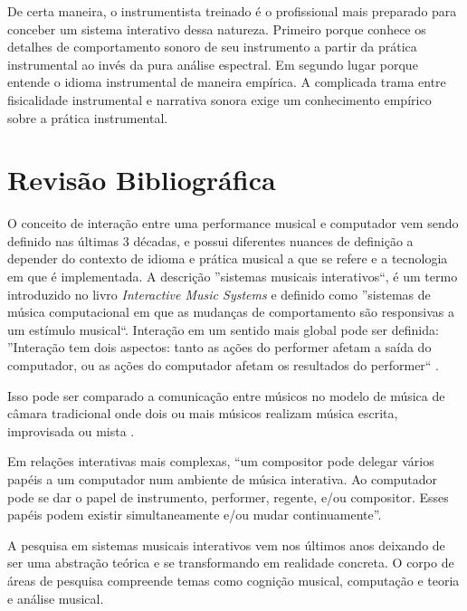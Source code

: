 \documentclass{ppgmus}
\begin{document}
De certa maneira, o instrumentista treinado é o profissional
mais preparado para conceber um sistema interativo dessa natureza.
Primeiro porque conhece os detalhes de comportamento sonoro de seu
instrumento a partir da prática instrumental ao invés da pura análise
espectral. Em segundo lugar porque entende o idioma instrumental
de maneira empírica. A complicada trama entre fisicalidade instrumental
e narrativa sonora exige um conhecimento empírico sobre a prática
instrumental.




\chapter{Revisão Bibliográfica}
\label{sec:rev}

O conceito de interação entre uma performance musical e computador vem
sendo definido nas últimas 3 décadas, e possui diferentes nuances de definição
a depender do contexto de idioma e prática musical a que se refere e a tecnologia
em que é implementada. A descrição ''sistemas musicais interativos``, é um
termo introduzido no livro \textit{Interactive Music Systems} 
\cite{rowe93:interactive} e definido como ''sistemas de música 
computacional em que as mudanças de comportamento são responsivas a um
estímulo musical``. Interação em um sentido mais global pode ser definida: 
  ''Interação tem dois aspectos:
tanto as ações do performer afetam a saída do computador, ou as ações do computador
afetam os resultados do performer`` \cite{garnett:2001}.

Isso pode ser comparado a comunicação entre músicos no modelo de  música de 
câmara tradicional onde dois ou mais músicos realizam música escrita, improvisada 
ou mista \cite{winkler93:interactive}.

Em relações interativas mais complexas, ``um compositor pode
delegar vários papéis a um computador num ambiente de música interativa. Ao
computador pode se dar o papel de instrumento, performer, regente, e/ou compositor.
Esses papéis podem existir  simultaneamente e/ou mudar continuamente''\cite{lippe:2002}.



A pesquisa em sistemas musicais interativos vem nos últimos anos
deixando de ser uma abstração teórica e se transformando em realidade
concreta. O corpo de áreas de pesquisa compreende temas como cognição
musical, computação e teoria e análise musical.
\end{document}

